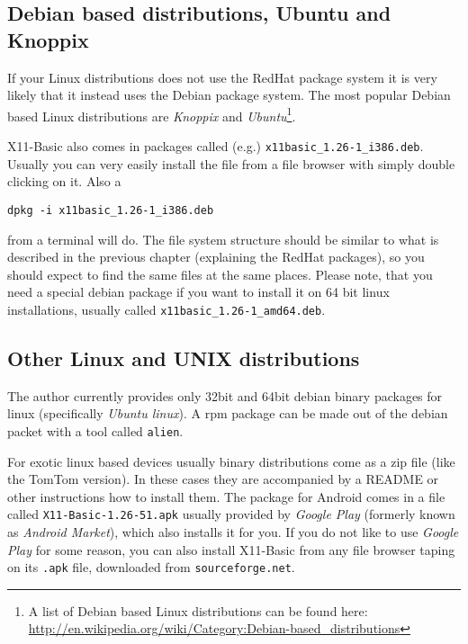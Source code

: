 \subsection*{Debian based distributions, Ubuntu and Knoppix}

If your Linux distributions does not use the RedHat package system it is very
likely that it instead uses the Debian package system. The most popular Debian
based Linux distributions are {\it Knoppix} and {\it Ubuntu}\footnote{A list of
Debian based Linux distributions can be found here:
\url{http://en.wikipedia.org/wiki/Category:Debian-based_distributions}}. 

X11-Basic also comes in packages called (e.g.)
\verb|x11basic_1.26-1_i386.deb|. Usually you can very easily install the file
from a file browser with simply double clicking on it. Also a 
\begin{verbatim}
dpkg -i x11basic_1.26-1_i386.deb
\end{verbatim} 
from a terminal will do. The file system structure should be similar
to what is described in the previous chapter (explaining the RedHat packages),
so you should expect to find the same files at the same places. Please note, 
that you need a special debian package if you want to install it on 64 bit linux
installations, usually called \verb|x11basic_1.26-1_amd64.deb|. 

\subsection*{Other Linux and UNIX distributions}

The author currently provides only 32bit and 64bit debian binary packages for 
linux (specifically {\it Ubuntu linux}). A
rpm package can be made out of the debian packet with a tool called
\verb|alien|. 

For exotic linux based devices usually binary distributions come as a zip file
(like the TomTom version). In these cases they are accompanied by a README or
other instructions how to install them. The  package for Android comes in a file
called \verb|X11-Basic-1.26-51.apk| usually  provided by {\it Google Play}
(formerly known as {\it Android Market}), which also installs it for you. If you
do not like to use {\it Google Play} for some reason, you can also install
X11-Basic from any file browser taping on its \verb|.apk| file, downloaded from
\verb|sourceforge.net|. 

